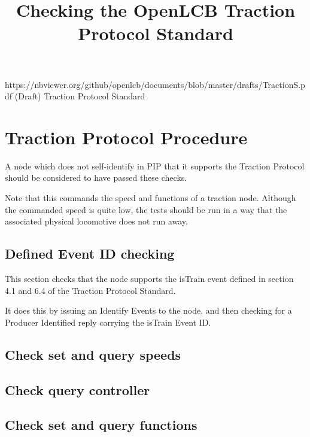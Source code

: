 

\title{Checking the OpenLCB Traction Protocol Standard}


\maketitle


\introductionCaveats
    {https://nbviewer.org/github/openlcb/documents/blob/master/drafts/TractionS.pdf}
    {(Draft) Traction Protocol Standard}

\section{Traction Protocol Procedure}


A node which does not self-identify in PIP that it supports
the Traction Protocol should be considered to have passed these checks.
\pipsetFootnote

Note that this commands the speed and functions of a traction node.
Although the commanded speed is quite low, the
tests should be run in a way that the associated physical locomotive
does not run away.

\subsection{Defined Event ID checking}

This section checks that the node supports the isTrain event
defined in section 4.1 and 6.4 of the Traction Protocol Standard.

It does this by issuing an Identify Events to the node, and then
checking for a Producer Identified reply carrying the isTrain Event ID.

\subsection{Check set and query speeds}

\subsection{Check query controller}

\subsection{Check set and query functions}

